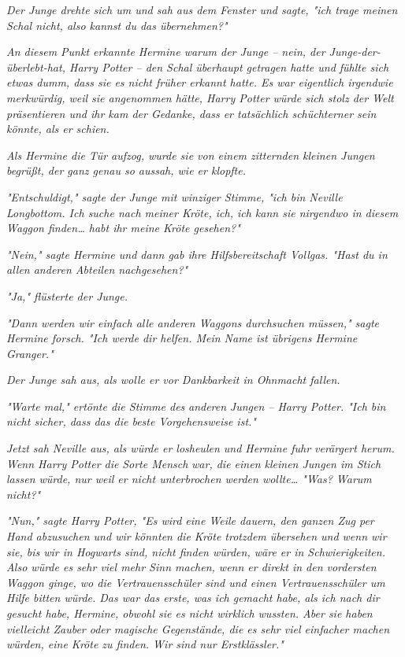 {\emph{Der Junge drehte sich um und sah aus dem Fenster und sagte, "ich trage meinen Schal nicht, also kannst du das übernehmen?"}

\emph{An diesem Punkt erkannte Hermine warum der Junge -- nein, der Junge-der-überlebt-hat, Harry Potter -- den Schal überhaupt getragen hatte und fühlte sich etwas dumm, dass sie es nicht früher erkannt hatte. Es war eigentlich irgendwie merkwürdig, weil sie angenommen hätte, Harry Potter würde sich stolz der Welt präsentieren und ihr kam der Gedanke, dass er tatsächlich schüchterner sein könnte, als er schien.}

\emph{Als Hermine die Tür aufzog, wurde sie von einem zitternden kleinen Jungen begrüßt, der ganz genau so aussah, wie er klopfte.}

\emph{"Entschuldigt," sagte der Junge mit winziger Stimme, "ich bin Neville Longbottom. Ich suche nach meiner Kröte, ich, ich kann sie nirgendwo in diesem Waggon finden… habt ihr meine Kröte gesehen?"}

\emph{"Nein," sagte Hermine und dann gab ihre Hilfsbereitschaft Vollgas. "Hast du in allen anderen Abteilen nachgesehen?"}

\emph{"Ja," flüsterte der Junge.}

\emph{"Dann werden wir einfach alle anderen Waggons durchsuchen müssen," sagte Hermine forsch. "Ich werde dir helfen. Mein Name ist übrigens Hermine Granger."}

\emph{Der Junge sah aus, als wolle er vor Dankbarkeit in Ohnmacht fallen.}

\emph{"Warte mal," ertönte die Stimme des} \emph{\emph{anderen}} \emph{Jungen -- Harry Potter. "Ich bin nicht sicher, dass das die beste Vorgehensweise ist."}

\emph{Jetzt sah Neville aus, als würde er losheulen und Hermine fuhr verärgert herum. Wenn Harry Potter die} \emph{Sorte Mensch} \emph{war, die einen kleinen Jungen im Stich lassen würde, nur weil er nicht unterbrochen werden wollte… "Was? Warum} \emph{\emph{nicht?}"}

\emph{"Nun," sagte Harry Potter, "Es wird eine Weile dauern, den ganzen Zug per Hand abzusuchen und wir könnten die Kröte trotzdem übersehen und wenn wir sie, bis wir in Hogwarts sind, nicht finden würden, wäre er in Schwierigkeiten. Also würde es sehr viel mehr Sinn machen, wenn er direkt in den vordersten Waggon ginge, wo die Vertrauensschüler sind und einen Vertrauensschüler um Hilfe bitten würde. Das war das erste, was ich gemacht habe, als ich nach dir gesucht habe, Hermine, obwohl sie es nicht wirklich wussten. Aber sie haben vielleicht Zauber oder magische Gegenstände, die es sehr viel einfacher machen würden, eine Kröte zu finden. Wir sind nur Erstklässler."}

}
